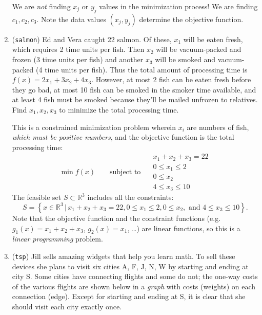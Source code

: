 \documentclass[11pt]{amsart}
\newcommand{\RR}{\mathbb{R}}
\begin{document}
\begin{enumerate}
We are \emph{not} finding $x_j$ or $y_j$ values in the minimization process!  We are finding $c_1,c_2,c_3$.  Note the data values $(x_j,y_j)$ determine the objective function.

\bigskip
\item (\texttt{salmon})  \quad Ed and Vera caught 22 salmon.  Of these, $x_1$ will be eaten fresh, which requires 2 time units per fish.  Then $x_2$ will be vacuum-packed and frozen (3 time units per fish) and another $x_3$ will be smoked and vacuum-packed (4 time units per fish).  Thus the total amount of processing time is $f(x) = 2 x_1 + 3 x_2 + 4 x_3$.  However, at most 2 fish can be eaten fresh before they go bad, at most 10 fish can be smoked in the smoker time available, and at least 4 fish must be smoked because they'll be mailed unfrozen to relatives.  Find $x_1,x_2,x_3$ to minimize the total processing time.

This is a constrained minimization problem wherein $x_i$ are numbers of fish, \emph{which must be positive numbers}, and the objective function is the total processing time:
	$$\min f(x) \qquad \text{subject to }\quad \begin{matrix} x_1 + x_2 + x_3 = 22 \\ 0 \le x_1 \le 2 \\ 0 \le x_2 \\ 4 \le x_3 \le 10 \end{matrix}$$
The feasible set $S\subset \RR^3$ includes all the constraints:
    $$S = \left\{x \in \RR^3\,\big|\,x_1 + x_2 + x_3 = 22, 0 \le x_1 \le 2, 0 \le x_2, \text{ and } 4 \le x_3 \le 10\right\}.$$
Note that the objective function and the constraint functions (e.g.~$g_1(x)=x_1+x_2+x_3$, $g_2(x)=x_1$, \dots) are linear functions, so this is a \emph{linear programming} problem.

\clearpage \newpage
\item (\texttt{tsp})  \quad Jill sells amazing widgets that help you learn math.  To sell these devices she plans to visit six cities A, F, J, N, W by starting and ending at city S.  Some cities have connecting flights and some do not; the one-way costs of the various flights are shown below in a \emph{graph} with costs (weights) on each connection (edge).  Except for starting and ending at S, it is clear that she should visit each city exactly once.

\begin{center}
\vspace{-5mm}
\end{center}
\end{enumerate}
\end{document}
